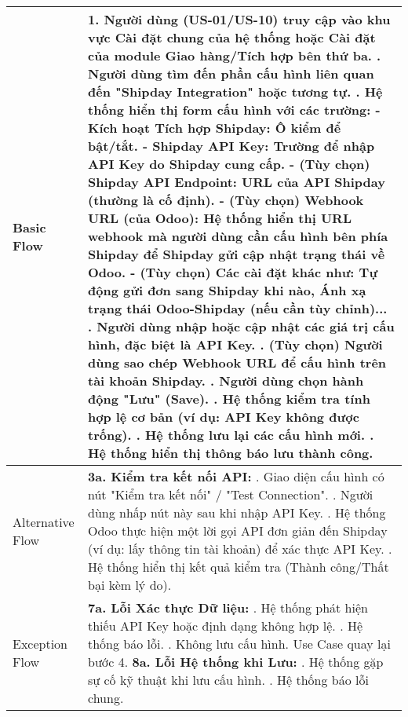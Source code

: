 \begin{longtable}{|m{4cm}|p{11cm}|}
Basic Flow & 1. Người dùng (US-01/US-10) truy cập vào khu vực Cài đặt chung của hệ thống hoặc Cài đặt của module Giao hàng/Tích hợp bên thứ ba. \newline 2. Người dùng tìm đến phần cấu hình liên quan đến "Shipday Integration" hoặc tương tự. \newline 3. Hệ thống hiển thị form cấu hình với các trường: \newline    - \textbf{Kích hoạt Tích hợp Shipday:} Ô kiểm để bật/tắt. \newline    - \textbf{Shipday API Key:} Trường để nhập API Key do Shipday cung cấp. \newline    - (Tùy chọn) \textbf{Shipday API Endpoint:} URL của API Shipday (thường là cố định). \newline    - (Tùy chọn) \textbf{Webhook URL (của Odoo):} Hệ thống hiển thị URL webhook mà người dùng cần cấu hình bên phía Shipday để Shipday gửi cập nhật trạng thái về Odoo. \newline    - (Tùy chọn) Các cài đặt khác như: Tự động gửi đơn sang Shipday khi nào, Ánh xạ trạng thái Odoo-Shipday (nếu cần tùy chỉnh)... \newline 4. Người dùng nhập hoặc cập nhật các giá trị cấu hình, đặc biệt là API Key. \newline 5. (Tùy chọn) Người dùng sao chép Webhook URL để cấu hình trên tài khoản Shipday. \newline 6. Người dùng chọn hành động "Lưu" (Save). \newline 7. Hệ thống kiểm tra tính hợp lệ cơ bản (ví dụ: API Key không được trống). \newline 8. Hệ thống lưu lại các cấu hình mới. \newline 9. Hệ thống hiển thị thông báo lưu thành công. \\
\hline
Alternative Flow & \textbf{3a. Kiểm tra kết nối API:} \newline    1. Giao diện cấu hình có nút "Kiểm tra kết nối" / "Test Connection". \newline    2. Người dùng nhấp nút này sau khi nhập API Key. \newline    3. Hệ thống Odoo thực hiện một lời gọi API đơn giản đến Shipday (ví dụ: lấy thông tin tài khoản) để xác thực API Key. \newline    4. Hệ thống hiển thị kết quả kiểm tra (Thành công/Thất bại kèm lý do). \\
\hline
Exception Flow & \textbf{7a. Lỗi Xác thực Dữ liệu:} \newline    1. Hệ thống phát hiện thiếu API Key hoặc định dạng không hợp lệ. \newline    2. Hệ thống báo lỗi. \newline    3. Không lưu cấu hình. Use Case quay lại bước 4. \newline \textbf{8a. Lỗi Hệ thống khi Lưu:} \newline    1. Hệ thống gặp sự cố kỹ thuật khi lưu cấu hình. \newline    2. Hệ thống báo lỗi chung. \\

\end{longtable}
